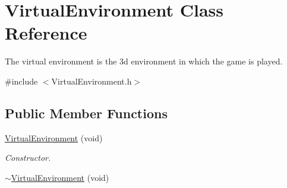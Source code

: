 \hypertarget{classVirtualEnvironment}{
\section{VirtualEnvironment Class Reference}
\label{classVirtualEnvironment}
}


The virtual environment is the 3d environment in which the game is played.  




{\ttfamily \#include $<$VirtualEnvironment.h$>$}

\subsection*{Public Member Functions}
\begin{DoxyCompactItemize}
\item 
\hypertarget{classVirtualEnvironment_ae0e38db3924687d121dfbda86e1d9b72}{
\hyperlink{classVirtualEnvironment_ae0e38db3924687d121dfbda86e1d9b72}{VirtualEnvironment} (void)}
\label{classVirtualEnvironment_ae0e38db3924687d121dfbda86e1d9b72}

\begin{DoxyCompactList}\small\item\em Constructor. \item\end{DoxyCompactList}\item 
\hypertarget{classVirtualEnvironment_a5e8b1b63923dd31b8574f88f18007da5}{
\hyperlink{classVirtualEnvironment_a5e8b1b63923dd31b8574f88f18007da5}{$\sim$VirtualEnvironment} (void)}
\label{classVirtualEnvironment_a5e8b1b63923dd31b8574f88f18007da5}


\end{DoxyCompactItemize}
